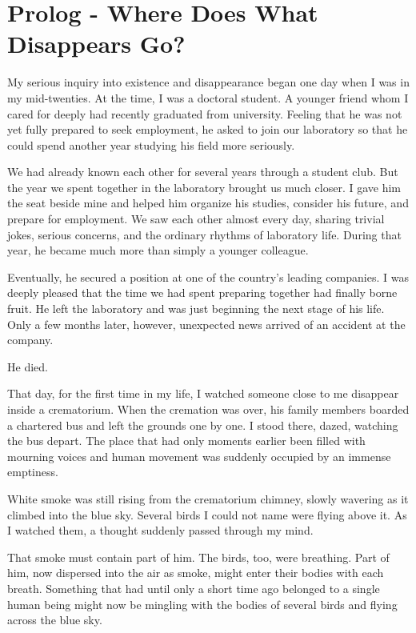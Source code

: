 \section*{Prolog - Where Does What Disappears Go?}

My serious inquiry into existence and disappearance began one day when I was in my mid-twenties. At the time, I was a doctoral student. A younger friend whom I cared for deeply had recently graduated from university. Feeling that he was not yet fully prepared to seek employment, he asked to join our laboratory so that he could spend another year studying his field more seriously.

We had already known each other for several years through a student club. But the year we spent together in the laboratory brought us much closer. I gave him the seat beside mine and helped him organize his studies, consider his future, and prepare for employment. We saw each other almost every day, sharing trivial jokes, serious concerns, and the ordinary rhythms of laboratory life. During that year, he became much more than simply a younger colleague.

Eventually, he secured a position at one of the country’s leading companies. I was deeply pleased that the time we had spent preparing together had finally borne fruit. He left the laboratory and was just beginning the next stage of his life. Only a few months later, however, unexpected news arrived of an accident at the company.

He died.

That day, for the first time in my life, I watched someone close to me disappear inside a crematorium. When the cremation was over, his family members boarded a chartered bus and left the grounds one by one. I stood there, dazed, watching the bus depart. The place that had only moments earlier been filled with mourning voices and human movement was suddenly occupied by an immense emptiness.

White smoke was still rising from the crematorium chimney, slowly wavering as it climbed into the blue sky. Several birds I could not name were flying above it. As I watched them, a thought suddenly passed through my mind.

That smoke must contain part of him. The birds, too, were breathing. Part of him, now dispersed into the air as smoke, might enter their bodies with each breath. Something that had until only a short time ago belonged to a single human being might now be mingling with the bodies of several birds and flying across the blue sky.

